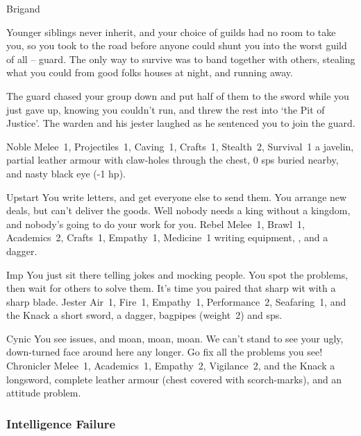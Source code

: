 \begin{multicols}{2}
\begin{itemize}
    {Brigand}%
    {
  Younger siblings never inherit, and your choice of guilds had no room to take you, so you took to the road before anyone could shunt you into the worst guild of all -- \gls{guard}.
  The only way to survive was to band together with others, stealing what you could from good folks houses at night, and running away.

  The \gls{guard} chased your group down and put half of them to the sword while you just gave up, knowing you couldn't run, and threw the rest into `the Pit of Justice'.
  The warden and his jester laughed as he sentenced you to join the \gls{guard}.
  }%
  {Noble}%
  {Melee~1, Projectiles~1, Caving~1, Crafts~1, Stealth~2, Survival~1}%
  {a javelin, partial leather armour with claw-holes through the chest, 0 \glspl{sp} buried nearby, and nasty black eye (-1 \gls{hp}).}%


  {Upstart}%
  {You write letters, and get everyone else to send them.
  You arrange new deals, but can't deliver the goods.
  Well nobody needs a king without a kingdom, and nobody's going to do your work for you.
  }%
  {Rebel}%
  {Melee~1, Brawl~1, Academics~2, Crafts~1, Empathy~1, Medicine~1}%
  {writing equipment, , and a dagger.}%

  {Imp}%
  {You just sit there telling jokes and mocking people.
  You spot the problems, then wait for others to solve them.
  It's time you paired that sharp wit with a sharp blade.
  }%
  {Jester}%
  {Air~1, Fire~1, Empathy~1, Performance~2, Seafaring~1, and the Knack \snapcaster}%
  {a short sword, a dagger, bagpipes (\gls{weight}~2) and  \glspl{sp}.}%

  {Cynic}%
  {You see issues, and moan, moan, moan.
  We can't stand to see your ugly, down-turned face around here any longer.
  Go fix all the problems you see!
  }%
  {Chronicler}%
  {Melee~1, Academics~1, Empathy~2, Vigilance~2, and the Knack \adrenalinesurge}%
  {a longsword, complete leather armour (chest covered with scorch-marks), and an attitude problem.}%


\end{itemize}

\needspace{10em}
\subsubsection{Intelligence Failure}


\end{multicols}
